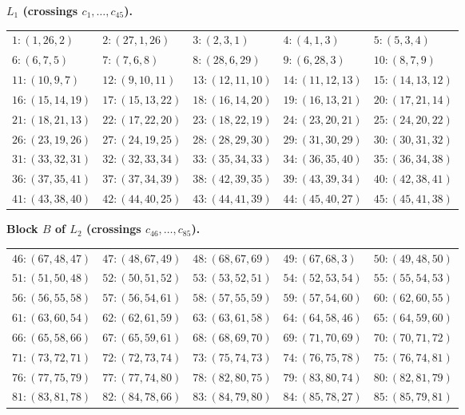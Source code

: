 \documentclass[11pt]{article}
\theoremstyle{definition}
\begin{document}
\noindent\textbf{$L_1$ (crossings $c_1,\dots,c_{45}$).}\\[2pt]
{\footnotesize\begin{tabular}{@{}lllll@{}}
$1\colon(1,26,2)$ & $2\colon(27,1,26)$ & $3\colon(2,3,1)$ & $4\colon(4,1,3)$ & $5\colon(5,3,4)$ \\
$6\colon(6,7,5)$ & $7\colon(7,6,8)$ & $8\colon(28,6,29)$ & $9\colon(6,28,3)$ & $10\colon(8,7,9)$ \\
$11\colon(10,9,7)$ & $12\colon(9,10,11)$ & $13\colon(12,11,10)$ & $14\colon(11,12,13)$ & $15\colon(14,13,12)$ \\
$16\colon(15,14,19)$ & $17\colon(15,13,22)$ & $18\colon(16,14,20)$ & $19\colon(16,13,21)$ & $20\colon(17,21,14)$ \\
$21\colon(18,21,13)$ & $22\colon(17,22,20)$ & $23\colon(18,22,19)$ & $24\colon(23,20,21)$ & $25\colon(24,20,22)$ \\
$26\colon(23,19,26)$ & $27\colon(24,19,25)$ & $28\colon(28,29,30)$ & $29\colon(31,30,29)$ & $30\colon(30,31,32)$ \\
$31\colon(33,32,31)$ & $32\colon(32,33,34)$ & $33\colon(35,34,33)$ & $34\colon(36,35,40)$ & $35\colon(36,34,38)$ \\
$36\colon(37,35,41)$ & $37\colon(37,34,39)$ & $38\colon(42,39,35)$ & $39\colon(43,39,34)$ & $40\colon(42,38,41)$ \\
$41\colon(43,38,40)$ & $42\colon(44,40,25)$ & $43\colon(44,41,39)$ & $44\colon(45,40,27)$ & $45\colon(45,41,38)$ \\
\end{tabular}}

\medskip
\noindent\textbf{Block $B$ of $L_2$ (crossings $c_{46},\dots,c_{85}$).}\\[2pt]
{\footnotesize\begin{tabular}{@{}lllll@{}}
$46\colon(67,48,47)$ & $47\colon(48,67,49)$ & $48\colon(68,67,69)$ & $49\colon(67,68,3)$ & $50\colon(49,48,50)$ \\
$51\colon(51,50,48)$ & $52\colon(50,51,52)$ & $53\colon(53,52,51)$ & $54\colon(52,53,54)$ & $55\colon(55,54,53)$ \\
$56\colon(56,55,58)$ & $57\colon(56,54,61)$ & $58\colon(57,55,59)$ & $59\colon(57,54,60)$ & $60\colon(62,60,55)$ \\
$61\colon(63,60,54)$ & $62\colon(62,61,59)$ & $63\colon(63,61,58)$ & $64\colon(64,58,46)$ & $65\colon(64,59,60)$ \\
$66\colon(65,58,66)$ & $67\colon(65,59,61)$ & $68\colon(68,69,70)$ & $69\colon(71,70,69)$ & $70\colon(70,71,72)$ \\
$71\colon(73,72,71)$ & $72\colon(72,73,74)$ & $73\colon(75,74,73)$ & $74\colon(76,75,78)$ & $75\colon(76,74,81)$ \\
$76\colon(77,75,79)$ & $77\colon(77,74,80)$ & $78\colon(82,80,75)$ & $79\colon(83,80,74)$ & $80\colon(82,81,79)$ \\
$81\colon(83,81,78)$ & $82\colon(84,78,66)$ & $83\colon(84,79,80)$ & $84\colon(85,78,27)$ & $85\colon(85,79,81)$ \\
\end{tabular}}

\medskip
\end{document}
